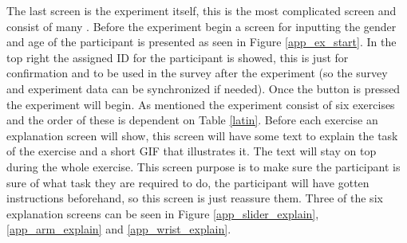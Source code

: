 The last screen is the experiment itself, this is the most complicated screen and consist of many . Before the experiment begin a screen for inputting the gender and age of the participant is presented as seen in Figure \ref{app_ex_start}. In the top right the assigned ID for the participant is showed, this is just for confirmation and to be used in the survey after the experiment (so the survey and experiment data can be synchronized if needed). Once the  button is pressed the experiment will begin. As mentioned the experiment consist of six exercises and the order of these is dependent on Table \ref{latin}. Before each exercise an explanation screen will show, this screen will have some text to explain the task of the exercise and a short GIF that illustrates it. The text will stay on top during the whole exercise. This screen purpose is to make sure the participant is sure of what task they are required to do, the participant will have gotten instructions beforehand, so this screen is just reassure them. Three of the six explanation screens can be seen in Figure \ref{app_slider_explain}, \ref{app_arm_explain} and \ref{app_wrist_explain}.

